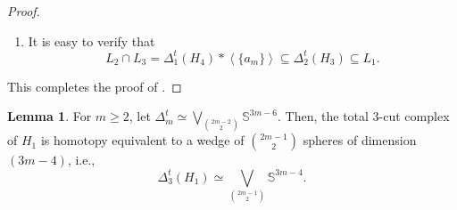 \documentclass[11pt,reqno,a4paper]{amsart}
\theoremstyle{definition}
\theoremstyle{theorem}
\newtheorem{lemma}[theorem]{Lemma}
\newcommand{\totalthreecut}{\Delta_{3}^t}
\newcommand{\lno}{\left(}
\newcommand{\rno}{\right)}
\newcommand{\bbS}{\mathbb{S}}
\theoremstyle{remark}
\begin{document}
\begin{proof}
\begin{enumerate}
\begin{enumerate}[label=\textbf{\Alph*.}, leftmargin=2.5em]
\begin{proof}[Proof of ]
    This completes the proof of 
    .
\end{proof}

    Now let $\sigma \in \Delta_2'$ with $\sigma \notin L_1$.  
    The complement 
    \(
        (\sigma \cup \{b_m\})^{c}
    \) 
    contains the vertices $\{c_m, b_{m+1}\}$, and  
    \(
        (\sigma \cup \{c_m\})^{c}
    \) 
    contains the vertices $\{b_m, c_{m+1}\}$.  
    It is easy to see that these two sets require at most two additional vertices, say $x$ and $y$, to form a $3$-element independent set,     \(
        \{x, c_m, b_{m+1}\}
    \) 
    and  
    \(
        \{y, b_m, c_{m+1}\}.
    \)

    One checks that $x = y$ works exactly when 
    \( x \in V\lno H_4 \rno \);  
    in this situation,  
    \( \sigma \in L_2 \).  
    If $x = y$ does not work, then  
    \( \{x, y\} \subseteq \{a_m, b_{m-1}, c_{m-1}\} \),  
    and the vertices $x$ and $y$ must be adjacent because  
    \( \sigma \notin L_1 \).  
    The only such adjacent pair is  
    \( (b_{m-1}, c_{m-1}) \),  
    in which case  
    \( \sigma \in L_3 \).
\end{enumerate}

    \item It is easy to verify that
    \[
        L_2 \cap L_3 
            = \Delta_1^t \lno H_4 \rno * \left\langle \{a_m\} \right\rangle
            \subseteq \Delta_2^t \lno H_3 \rno 
            \subseteq L_1.
    \]
\end{enumerate}
This completes the proof of 
.
\end{proof}

\begin{lemma}\label{lemma: homotopy of total 3-cut of (3×n)gg'}
    For $m\geq 2$, let $\Delta_m^t \simeq \bigvee\limits_{\binom{2m-2}{2}} \bbS^{3m-6}$. Then, the total 3-cut complex of $H_1$ is homotopy equivalent to a wedge of $\binom{2m-1}{2}$ spheres of dimension $\lno 3m-4 \rno$, i.e., $$\totalthreecut \lno H_1 \rno \simeq \bigvee\limits_{\binom{2m-1}{2}}\bbS^{3m-4}.$$
\end{lemma}
\end{document}
